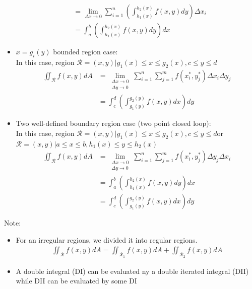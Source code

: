 \documentclass[UTF8,a4paper, 10pt, openany]{book}
\begin{document}
\begin{itemize}
\begin{align*}
&= \lim_{\Delta x\to 0}\displaystyle\sum_{i=1}^{n}\left(\displaystyle\int_{h_{1}(x)}^{h_{2}(x)}f(x,y)dy \right)\Delta x_{i}\\
&= \displaystyle\int_{a}^{b}\left(\displaystyle\int_{h_{1}(x)}^{h_{2}(x)}f(x,y)dy \right)dx
\end{align*}
\item $x=g_{i}(y)$ bounded region case:\\
In this case, region $\mathcal{R}={(x,y)|g_{1}(x)\leq x\leq g_{2}(x), c\leq y\leq d}$
\begin{align*}
\iint_{\mathcal{R}}f(x,y)dA &= \lim_{\substack{\Delta x\to 0\\ \Delta y\to 0}}\displaystyle\sum_{i=1}^{n}\displaystyle\sum_{j=1}^{m} f(x_i^*,y_j^*)\Delta x_{i}\Delta y_{j}\\
&= \displaystyle\int_{c}^{d}\left(\displaystyle\int_{g_{1}(y)}^{g_{2}(y)}f(x,y)dx \right)dy
\end{align*}
\item Two well-defined boundary region case (two point closed loop):\\
In this case, region $\mathcal{R}={(x,y)|g_{1}(x)\leq x\leq g_{2}(x), c\leq y\leq d}$or\\
$\mathcal{R}={(x,y)|a\leq x\leq b, h_{1}(x)\leq y\leq h_{2}(x)}$\\
\begin{align*}
\iint_{\mathcal{R}}f(x,y)dA &= \lim_{\substack{\Delta x\to 0\\ \Delta y\to 0}}\displaystyle\sum_{i=1}^{n}\displaystyle\sum_{j=1}^{m} f(x_i^*,y_j^*)\Delta y_{j}\Delta x_{i}\\
&= \displaystyle\int_{a}^{b}\left(\displaystyle\int_{h_{1}(x)}^{h_{2}(x)}f(x,y)dy \right)dx\\
&= \displaystyle\int_{c}^{d}\left(\displaystyle\int_{g_{1}(y)}^{g_{2}(y)}f(x,y)dx \right)dy
\end{align*}
\end{itemize}
Note:
\begin{itemize}
\item For an irregular regions, we divided it into regular regions.
\begin{align*}
\iint_{\mathcal{R}}f(x,y)dA=\iint_{\mathcal{R}_1}f(x,y)dA+\iint_{\mathcal{R}_2}f(x,y)dA
\end{align*}
\item A double integral (DI) can be evaluated ny a double iterated integral (DII) while DII can be evaluated by some DI
\end{itemize}
\end{document}
